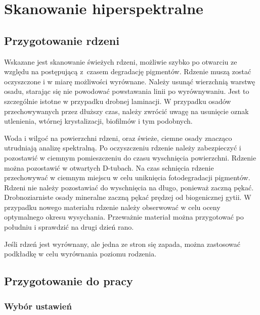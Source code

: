 \documentclass[
  letterpaper,
  DIV=11,
  numbers=noendperiod]{scrreprt}
\begin{document}
\hypertarget{skanowanie-hiperspektralne}{%
\chapter{Skanowanie hiperspektralne}\label{skanowanie-hiperspektralne}}

\hypertarget{przygotowanie-rdzeni}{%
\section{Przygotowanie rdzeni}\label{przygotowanie-rdzeni}}

Wskazane jest skanowanie świeżych rdzeni, możliwie szybko po otwarciu ze
względu na postępującą z~czasem degradację pigmentów. Rdzenie muszą
zostać oczyszczone i w miarę możliwości wyrównane. Należy usunąć
wierzchnią warstwę osadu, starając się nie powodować powstawania linii
po wyrównywaniu. Jest to szczególnie istotne w przypadku drobnej
laminacji. W przypadku osadów przechowywanych przez dłuższy czas, należy
zwrócić uwagę na usunięcie oznak utlenienia, wtórnej krystalizacji,
biofilmów i tym podobnych.

Woda i wilgoć na powierzchni rdzeni, oraz świeże, ciemne osady znacząco
utrudniają analizę spektralną. Po oczyszczeniu rdzenie należy
zabezpieczyć i pozostawić w ciemnym pomieszczeniu do czasu wyschnięcia
powierzchni. Rdzenie można pozostawić w otwartych D-tubach. Na czas
schnięcia rdzenie przechowywać w ciemnym miejscu w celu uniknięcia
fotodegradacji pigmentów. Rdzeni nie należy pozostawiać do wyschnięcia
na długo, ponieważ zaczną pękać. Drobnoziarniste osady mineralne zaczną
pękać prędzej od biogenicznej gytii. W przypadku nowego materiału
rdzenie należy obserwować w celu oceny optymalnego okresu wysychania.
Przeważnie materiał można przygotować po południu i sprawdzić na drugi
dzień rano.

Jeśli rdzeń jest wyrównany, ale jedna ze stron się zapada, można
zastosować podkładkę w celu wyrównania poziomu rodzenia.

\hypertarget{przygotowanie-do-pracy-5}{%
\section{Przygotowanie do pracy}\label{przygotowanie-do-pracy-5}}

\hypertarget{wybuxf3r-ustawieux144}{%
\subsection{Wybór ustawień}\label{wybuxf3r-ustawieux144}}
\end{document}
